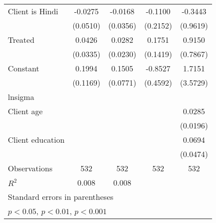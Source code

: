 \begin{table}[htbp]
\begin{tabular}{l*{4}{c}}
\addlinespace
Client is Hindi     &     -0.0275         &     -0.0168         &     -0.1100         &     -0.3443         \\
                    &    (0.0510)         &    (0.0356)         &    (0.2152)         &    (0.9619)         \\
\addlinespace
Treated             &      0.0426         &      0.0282         &      0.1751         &      0.9150         \\
                    &    (0.0335)         &    (0.0230)         &    (0.1419)         &    (0.7867)         \\
\addlinespace
Constant            &      0.1994         &      0.1505         &     -0.8527         &      1.7151         \\
                    &    (0.1169)         &    (0.0771)         &    (0.4592)         &    (3.5729)         \\
\midrule
lnsigma             &                     &                     &                     &                     \\
Client age          &                     &                     &                     &      0.0285         \\
                    &                     &                     &                     &    (0.0196)         \\
\addlinespace
Client education    &                     &                     &                     &      0.0694         \\
                    &                     &                     &                     &    (0.0474)         \\
\midrule
Observations        &         532         &         532         &         532         &         532         \\
\(R^{2}\)           &       0.008         &       0.008         &                     &                     \\
\bottomrule
\multicolumn{5}{l}{\footnotesize Standard errors in parentheses}\\
\multicolumn{5}{l}{\footnotesize \sym{*} \(p<0.05\), \sym{**} \(p<0.01\), \sym{***} \(p<0.001\)}\\
\end{tabular}
\end{table}

